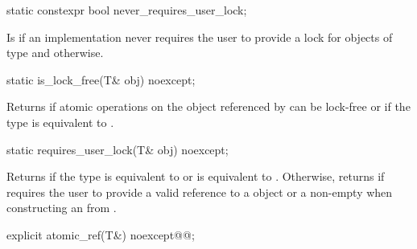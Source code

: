 \begin{addedblock}
\begin{itemdecl}
static constexpr bool never_requires_user_lock;
\end{itemdecl}

\begin{itemdescr}
\pnum
Is  if an implementation never requires the user to provide a 
lock for objects of type  and  otherwise.
\end{itemdescr}


\begin{itemdecl}
static is_lock_free(T& obj) noexcept;
\end{itemdecl}

\begin{itemdescr}
\returns Returns  if atomic operations on the object referenced by
 can be lock-free or if the  type is equivalent to 
.
\end{itemdescr}


\begin{itemdecl}
static requires_user_lock(T& obj) noexcept;
\end{itemdecl}

\begin{itemdescr}
\returns Returns  if the type  is equivalent to 
or  is equivalent to .
Otherwise, returns  if  requires the user to
provide a valid reference to a  object 
or a non-empty  
when constructing an  from . 
\end{itemdescr}
\end{addedblock}


\begin{itemdecl}
explicit atomic_ref(T&) noexcept@\added{(\seebelow)}@;
\end{itemdecl}


